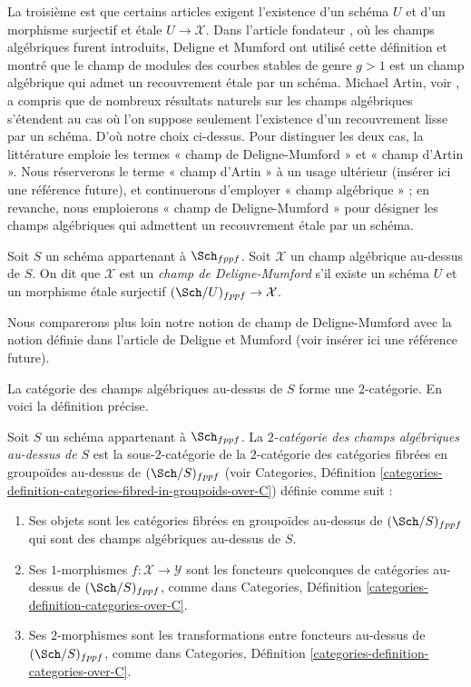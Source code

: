 \medskip\noindent
La troisième est que certains articles exigent l'existence d'un
schéma $U$ et d'un morphisme surjectif et \'etale $U \to \mathcal{X}$.
Dans l'article fondateur \cite{DM}, où les champs algébriques furent introduits,
Deligne et Mumford ont utilisé cette définition et montré que
le champ de modules des courbes stables de genre $g > 1$ est un champ algébrique
qui admet un recouvrement \'etale par un schéma. Michael Artin, voir
\cite{ArtinVersal}, a compris que de nombreux
résultats naturels sur les champs algébriques s'étendent au cas où l'on
suppose seulement l'existence d'un recouvrement lisse par un schéma. D'où notre choix ci-dessus.
Pour distinguer les deux cas, la littérature emploie les termes « champ de Deligne-Mumford »
et « champ d'Artin ». Nous réserverons le terme
« champ d'Artin » à un usage ultérieur (insérer ici une référence future), et continuerons
d'employer « champ algébrique » ; en revanche, nous emploierons « champ de Deligne-Mumford »
pour désigner les champs algébriques qui admettent un recouvrement \'etale par un
schéma.

\begin{definition}
\label{definition-deligne-mumford}
Soit $S$ un schéma appartenant à $\Sch_{fppf}$.
Soit $\mathcal{X}$ un champ algébrique au-dessus de $S$.
On dit que $\mathcal{X}$ est un {\it champ de Deligne-Mumford} s'il existe
un schéma $U$ et un morphisme \'etale surjectif
$(\Sch/U)_{fppf} \to \mathcal{X}$.
\end{definition}

\noindent
Nous comparerons plus loin notre notion de champ de Deligne-Mumford avec
la notion définie dans l'article de Deligne et Mumford
(voir insérer ici une référence future).

\medskip\noindent
La catégorie des champs algébriques au-dessus de $S$ forme une $2$-catégorie.
En voici la définition précise.

\begin{definition}
\label{definition-morphism-algebraic-stacks}
Soit $S$ un schéma appartenant à $\Sch_{fppf}$.
La {\it $2$-catégorie des champs algébriques au-dessus de $S$} est la
sous-$2$-catégorie de la $2$-catégorie des catégories fibrées en
groupoïdes au-dessus de $(\Sch/S)_{fppf}$ (voir
Categories,
Définition \ref{categories-definition-categories-fibred-in-groupoids-over-C})
définie comme suit :
\begin{enumerate}
\item Ses objets sont les catégories fibrées en groupoïdes
au-dessus de $(\Sch/S)_{fppf}$ qui sont des champs algébriques au-dessus de $S$.
\item Ses $1$-morphismes $f : \mathcal{X} \to \mathcal{Y}$ sont
les foncteurs quelconques de catégories au-dessus de $(\Sch/S)_{fppf}$, comme dans
Categories, Définition \ref{categories-definition-categories-over-C}.
\item Ses $2$-morphismes sont les transformations entre foncteurs
au-dessus de $(\Sch/S)_{fppf}$, comme dans
Categories, Définition \ref{categories-definition-categories-over-C}.
\end{enumerate}
\end{definition}

